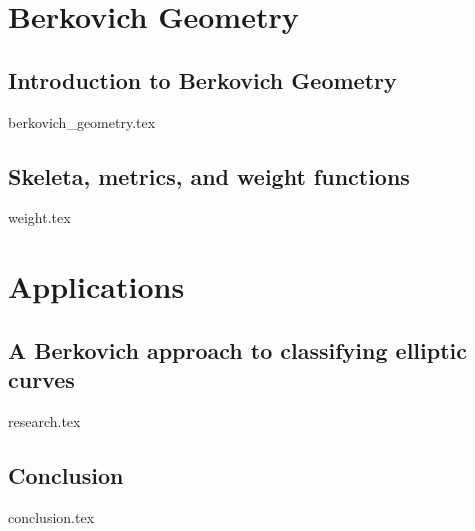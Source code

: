 \part{Berkovich Geometry}
\chapter{Introduction to Berkovich Geometry} \label{chap:intro_berkovich}
{berkovich_geometry.tex}


\chapter{Skeleta, metrics, and weight functions} \label{chap:weight_functions}
{weight.tex}

\part{Applications}
\chapter{A Berkovich approach to classifying elliptic curves} \label{chap:a_berkovich_approach_to_classifying_elliptic_curves}
{research.tex}

\chapter{Conclusion} \label{chap:conclusion}
{conclusion.tex}

\pagebreak
\printbibliography



